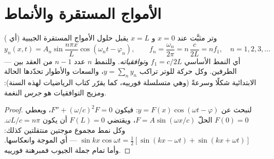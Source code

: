 \section{الأمواج المستقرة والأنماط}

\begin{proposition}\label{prop:b2:waves-on-strings:modes}
وتر مثبَّت عند $x = 0$ و $x = L$ يقبل حلول الأمواج المستقرة
الجيبية (أي \emph{})
\[
y_n(x, t) = A_n\sin\frac{n\pi x}{L}\cos(\omega_nt - \varphi_n) , \qquad
f_n = \frac{\omega_n}{2\pi} = n\,\frac{c}{2L} = n f_1 , \quad n = 1, 2, 3, \dots
\]
--- أي النمط الأساسي $f_1 = c/2L$ و\emph{توافقياته}. وللنمط $n$
عدد $n - 1$ من العقد بين الطرفين. وكل حركة للوتر تراكب
$y = \sum_ny_n$، والسعات والأطوار تحدّدها الحالة الابتدائية
شكلًا وسرعةً (وهي متسلسلة فورييه، كما يقرّر كتاب الرياضيات
لهذه السنة): ومزيج التوافقيات هو \emph{جرس} النغمة.
\end{proposition}

\begin{proof}
لنبحث عن $y = F(x)\cos(\omega t - \varphi)$: فيكون $F'' + (\omega/c)^2F = 0$، ويعطي $F(0) = 0$
الحلّ $F = A\sin(\omega x/c)$، ويقتضي $F(L) = 0$ أن يكون $\omega L/c = n\pi$. وكل نمط
مجموع موجتين منتقلتين كذلك: $\sin kx\cos\omega t = \tfrac12[\sin(kx -
\omega t) + \sin(kx + \omega t)]$ --- أي الموجة وانعكاسها. وأما
تمام جملة الجيوب فمبرهنة فورييه.
\end{proof}

